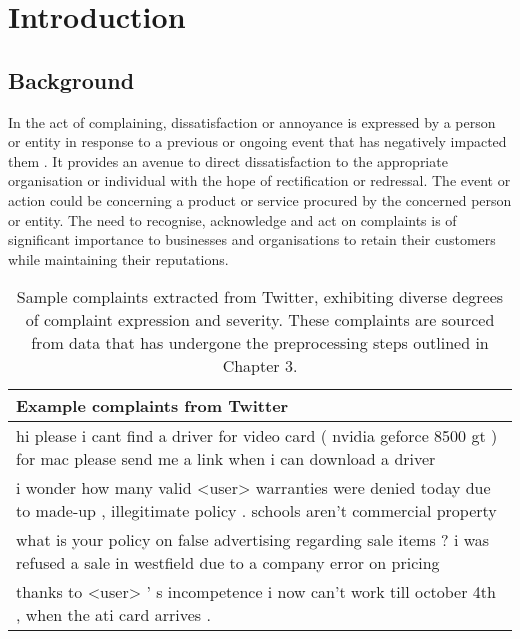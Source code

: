 \chapter{Introduction}

\section{Background}
In the act of complaining, dissatisfaction or annoyance is expressed by a person or entity in response to a previous or ongoing event that has negatively impacted them \cite{olshtain_speechact_1987}. It provides an avenue to direct dissatisfaction to the appropriate organisation or individual with the hope of rectification or redressal. The event or action could be concerning a product or service procured by the concerned person or entity. The need to recognise, acknowledge and act on complaints is of significant importance to businesses and organisations to retain their customers while maintaining their reputations.

\begin{table}[ht]
    \centering
    \begin{tabularx}{\textwidth}{|X|}
        \hline
        \rowcolor[gray]{0.7}
        \textbf{Example complaints from Twitter}                                                                                                                       \\
        \hline
        hi please i cant find a driver for video card ( nvidia geforce 8500 gt ) for mac please send me a link when i can download a driver   \\
        \hline
        i wonder how many valid <user> warranties were denied today due to made-up , illegitimate policy . schools aren't commercial property \\
        \hline
        what is your policy on false advertising regarding sale items ? i was refused a sale in westfield due to a company error on pricing   \\
        \hline
        thanks to <user> ' s incompetence i now can't work till october 4th , when the ati card arrives .                                    \\
        \hline
    \end{tabularx}
    \caption{Sample complaints extracted from Twitter, exhibiting diverse degrees of complaint expression and severity. These complaints are sourced from data that has undergone the preprocessing steps outlined in Chapter 3.}
    \label{tab: ex_complaints}
\end{table}



